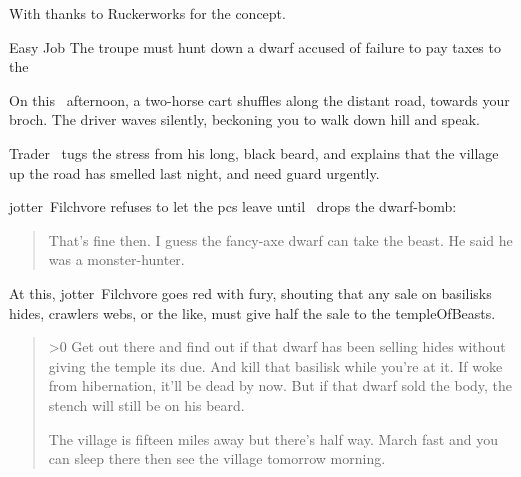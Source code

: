 \documentclass[10pt,twoside]{book}
\begin{document}

{
  \footnotesize

  \vfill
  {\sffamily With thanks to Ruckerworks for the concept.}
}

\clearpage

\pagestyle{minizine}%


{Easy Job}%
{The troupe must hunt down a dwarf accused of failure to pay taxes to the }%

\begin{boxtext}
  On this \showTemperature\ afternoon, a two-horse cart shuffles along the distant road, towards your \gls{broch}.
  The driver waves silently, beckoning you to walk down hill and speak.
\end{boxtext}

Trader \marketFence\ tugs the stress from his long, black beard, and explains that the \gls{village} up the road has smelled  last night, and need \gls{guard} urgently.

\Gls{jotter}~Filchvore refuses to let the \glspl{pc} leave until \marketFence\ drops the dwarf-bomb:

\begin{quotation}
    That's fine then.
    I guess the fancy-axe dwarf can take the beast.
    He said he was a monster-hunter.
\end{quotation}

At this, \Gls{jotter}~Filchvore goes red with fury, shouting that any sale on \glspl{basilisk} hides, \glspl{crawler} webs, or the like, must give half the sale to the \gls{templeOfBeasts}.

\begin{quotation}
    \ifnum\thetemperature>0
      Get out there and find out if that dwarf has been selling hides without giving the temple its due.
      And kill that \gls{basilisk} while you're at it.
    \else
      If  woke from hibernation, it'll be dead by now.
      But if that dwarf sold the body, the stench will still be on his beard.
    \fi

    The \gls{village} is fifteen miles away but
    there's  half way.
    March fast and you can sleep there then see the \gls{village} tomorrow morning.
\end{quotation}
\end{document}
